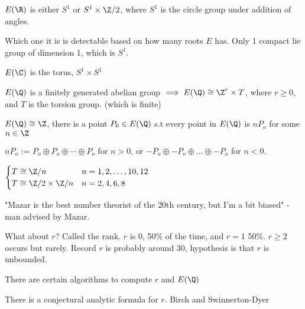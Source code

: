 \documentclass[twoside, 10pt]{article}
\begin{document}
\begin{exm*}
    $E(\R)$ is either $S^1$ or $S^1 \times \Z/2$, where $S^1$ is the circle group under addition of angles.
\end{exm*}
Which one it is is detectable based on how many roots $E$ has. Only 1 compact lie group of dimension 1, which is $S^1$.

\begin{exm*}
    $E(\C)$ is the torus, $S^1 \times S^1$
\end{exm*}

\begin{thm}
    $E(\Q)$ is a finitely generated abelian group $\implies E(\Q) \cong \Z^r \times T$, where $r \geq 0$, and $T$ is the torsion group. (which is finite) %
\end{thm}


\begin{exm*}
    $E(\Q) \cong \Z$, there is a point $P_0 \in E(\Q)$ s.t every point in $E(\Q)$ is $nP_o$ for some $n\in \Z$
\end{exm*}
$nP_o$ := $P_o \oplus P_o \oplus \cdots \oplus P_o$ for $n > 0$, or $-P_o \oplus -P_o \oplus \ldots \oplus -P_o$ for $n < 0$.

\begin{thm}[Mazar, 1977]
    $\begin{cases}
        T \cong \Z/n & n = 1, 2, \ldots, 10, 12\\
        T \cong \Z/2 \times \Z/n & n = 2, 4, 6, 8\\
    \end{cases}$
\end{thm}

"Mazar is the best number theorist of the 20th century, but I'm a bit biased" - man advised by Mazar.

What about $r$? Called the rank. $r$ is 0, 50\% of the time, and $r = 1$ 50\%. $r \geq 2$ occurs but rarely. Record $r$ is probably around 30, hypothesis is that $r$ is unbounded.

There are certain algorithms to compute $r$ and $E(\Q)$

\begin{rmk}
    There is a conjectural analytic formula for $r$. Birch and Swinnerton-Dyer %
\end{rmk}

\end{document}
